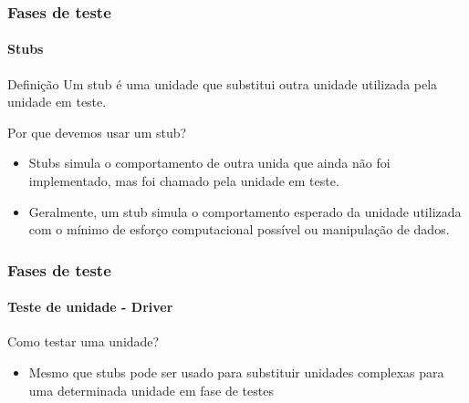 \begin{frame}
\frametitle{Fases de teste}
\framesubtitle{Stubs}
\label{concept:stub}

\begin{block:concept}{Definição}
Um stub é uma unidade que substitui outra unidade utilizada pela unidade em teste.
\end{block:concept}

\begin{block:fact}{Por que devemos usar um stub?}
\begin{itemize}
	\item Stubs simula o comportamento de outra unida que ainda não foi implementado, mas foi chamado pela unidade em teste.

	\item Geralmente, um stub  simula o comportamento esperado da unidade utilizada com o mínimo de esforço computacional possível ou manipulação de dados.
\end{itemize}
\end{block:fact}

\hfill
{}
\end{frame}


\begin{frame}
\frametitle{Fases de teste}
\framesubtitle{Teste de unidade - Driver}

\begin{block:fact}{Como testar uma unidade?}
\begin{itemize}
	\item Mesmo que stubs pode ser usado para substituir unidades complexas para uma determinada unidade em fase de testes 
\end{itemize}
\end{block:fact}
\end{frame}



